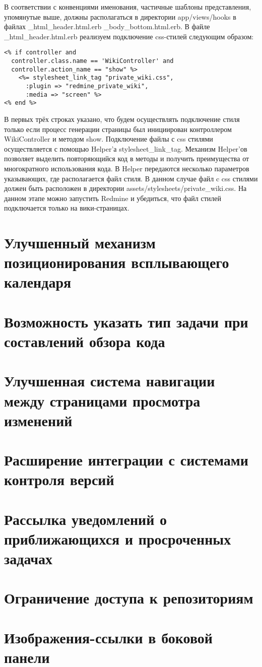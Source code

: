 В соответствии с конвенциями именования, частичные шаблоны представления,
упомянутые выше, должны располагаться в директории app/views/hooks в файлах
\_html\_header.html.erb \_body\_bottom.html.erb. В файле
\_html\_header.html.erb реализуем подключение css-стилей следующим образом:
\small{
\begin{lstlisting}
<% if controller and 
  controller.class.name == 'WikiController' and 
  controller.action_name == "show" %>
    <%= stylesheet_link_tag "private_wiki.css", 
      :plugin => "redmine_private_wiki", 
      :media => "screen" %>
<% end %>
\end{lstlisting}
}
В первых трёх строках указано, что будем осуществлять подключение стиля только
если процесс генерации страницы был инициирован контроллером WikiController и
методом show. Подключение файлы с css стилями осуществляется с помощью Helper'а
stylesheet\_link\_tag. Механизм Helper'ов позволяет выделить повторяющийся код
в методы и получить преимущества от многократного использования кода. В Helper
передаются несколько параметров указывающих, где располагается файл стиля. В
данном случае файл c css стилями должен быть расположен в директории
assets/stylesheets/private\_wiki.css. На данном этапе можно запустить Redmine и
убедиться, что файл стилей подключается только на вики-страницах.


\section{Улучшенный механизм позиционирования всплывающего календаря}

\section{Возможность указать тип задачи при составлений обзора кода}

\section{Улучшенная система навигации между страницами просмотра изменений}

\section{Расширение интеграции с системами контроля версий}

\section{Рассылка уведомлений о приближающихся и просроченных задачах}

\section{Ограничение доступа к репозиториям}

\section{Изображения-ссылки в боковой панели}



